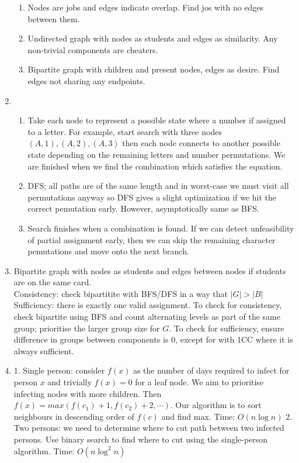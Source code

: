 \documentclass[12pt, a4paper]{article}
\begin{document}
\begin{enumerate}[Q\arabic*.]
\begin{enumerate}[(\alph*.)]
      \item Nodes are jobs and edges indicate overlap. Find jos with no edges between them.

      \item Undirected graph with nodes as students and edges as similarity. Any non-trivial components are cheaters.

      \item Bipartite graph with children and present nodes, edges as desire. Find edges not sharing any endpoints. 
    \end{enumerate}

  \item 
    \begin{enumerate}[(\alph*.)]
      \item Take each node to represent a possible state where a number if assigned to a letter. For example, start search with three nodes $(A, 1), (A, 2), (A, 3)$ then each node connects to another possible state depending on the remaining letters and number permutations. We are finished when we find the combination which satisfies the equation. 

      \item DFS; all paths are of the same length and in worst-case we must visit all permutations anyway so DFS gives a slight optimization if we hit the correct pemutation early. However, asymptotically same as BFS. 

      \item Search finishes when a combination is found. If we can detect unfeasibility of partial assignment early, then we can skip the remaining character pemutations and move onto the next branch.
    \end{enumerate}

  \item Bipartite graph with nodes as students and edges between nodes if students are on the same card.\\
    Consistency: check bipartitite with BFS/DFS in a way that $|G| > |B|$\\
    Sufficiency: there is exactly one valid assignment. 
    To check for consistency, check bipartite using BFS and count alternating levels as part of the same group; prioritise the larger group size for $G$. To check for sufficiency, ensure difference in groups between components is 0, except for with 1CC where it is always sufficient. 

  \item 1. Single person: consider $f(x)$ as the number of days required to infect for person $x$ and trivially $f(x)=0$ for a leaf node. We aim to prioritise infecting nodes with more children. Then $f(x) = max(f(c_1)+1, f(c_2)+2, \cdots)$. Our algorithm is to sort neighbours in descending order of $f(c)$ and find max. Time: $O(n\log n)$
    2. Two persons: we need to determine where to cut path between two infected persons. Use binary search to find where to cut using the single-person algorithm. Time: $O(n\log^2n)$
\end{enumerate}
\end{document}
